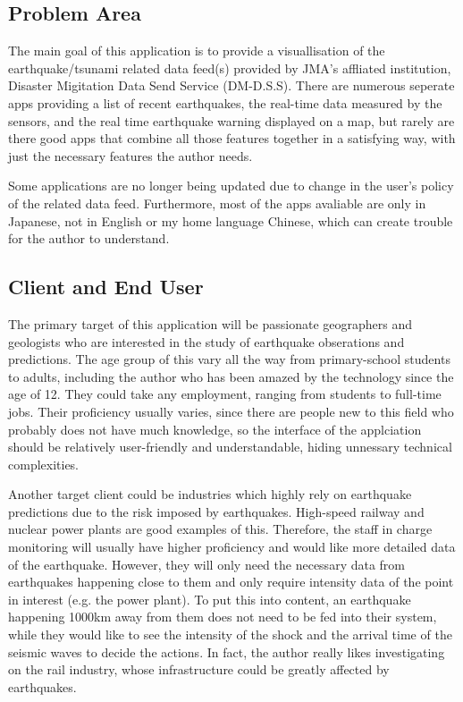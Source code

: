 \documentclass[10pt]{article}
\begin{document}
\subsection{Problem Area}
The main goal of this application is to provide a visuallisation of the earthquake/tsunami related data feed(s) provided by JMA's affliated institution, Disaster Migitation Data Send Service (DM-D.S.S). There are numerous seperate apps providing a list of recent earthquakes, the real-time data measured by the sensors, and the real time earthquake warning displayed on a map, but rarely are there good apps that combine all those features together in a satisfying way, with just the necessary features the author needs.

Some applications are no longer being updated due to change in the user's policy of the related data feed. Furthermore, most of the apps avaliable are only in Japanese, not in English or my home language Chinese, which can create trouble for the author to understand.

\subsection{Client and End User}
The primary target of this application will be passionate geographers and geologists who are interested in the study of earthquake obserations and predictions. The age group of this vary all the way from primary-school students to adults, including the author who has been amazed by the technology since the age of 12. They could take any employment, ranging from students to full-time jobs. Their proficiency usually varies, since there are people new to this field who probably does not have much knowledge, so the interface of the applciation should be relatively user-friendly and understandable, hiding unnessary technical complexities.

Another target client could be industries which highly rely on earthquake predictions due to the risk imposed by earthquakes. High-speed railway and nuclear power plants are good examples of this. Therefore, the staff in charge monitoring will usually have higher proficiency and would like more detailed data of the earthquake. However, they will only need the necessary data from earthquakes happening close to them and only require intensity data of the point in interest (e.g. the power plant). To put this into content, an earthquake happening 1000km away from them does not need to be fed into their system, while they would like to see the intensity of the shock and the arrival time of the seismic waves to decide the actions. In fact, the author really likes investigating on the rail industry, whose infrastructure could be greatly affected by earthquakes.
\end{document}
